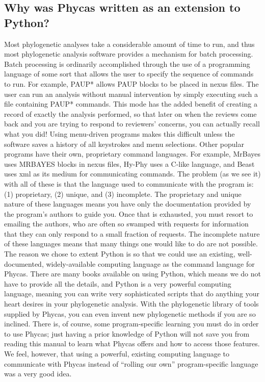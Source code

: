 \documentclass[10pt]{article}
\begin{document}
\subsection{Why was Phycas written as an extension to Python?}
Most phylogenetic analyses take a considerable amount of time to run, and thus most phylogenetic analysis software provides a mechanism for batch processing. Batch processing is ordinarily accomplished through the use of a programming language of some sort that allows the user to specify the sequence of commands to run. For example, PAUP* allows PAUP blocks to be placed in nexus files. The user can run an analysis without manual intervention by simply executing such a file containing PAUP* commands. This mode has the added benefit of creating a record of exactly the analysis performed, so that later on when the reviews come back and you are trying to respond to reviewers' concerns, you can actually recall what you did! Using menu-driven programs makes this difficult unless the software saves a history of all keystrokes and menu selections. Other popular programs have their own, proprietary command languages. For example, MrBayes uses MRBAYES blocks in nexus files, Hy-Phy uses a C-like language, and Beast uses xml as its medium for communicating commands. The problem (as we see it) with all of these is that the language used to communicate with the program is: (1) proprietary, (2) unique, and (3) incomplete. The proprietary and unique nature of these languages means you have only the documentation provided by the program's authors to guide you. Once that is exhausted, you must resort to emailing the authors, who are often so swamped with requests for information that they can only respond to a small fraction of requests. The incomplete nature of these languages means that many things one would like to do are not possible. The reason we chose to extent Python is so that we could use an existing, well-documented, widely-available computing language as the command language for Phycas. There are many books available on using Python, which means we do not have to provide all the details, and Python is a very powerful computing language, meaning you can write very sophisticated scripts that do anything your heart desires in your phylogenetic analysis. With the phylogenetic library of tools supplied by Phycas, you can even invent new phylogenetic methods if you are so inclined. There is, of course, some program-specific learning you must do in order to use Phycas; just having a prior knowledge of Python will not save you from reading this manual to learn what Phycas offers and how to access those features. We feel, however, that using a powerful, existing computing language to communicate with Phycas instead of ``rolling our own'' program-specific language was a very good idea.
\end{document}
